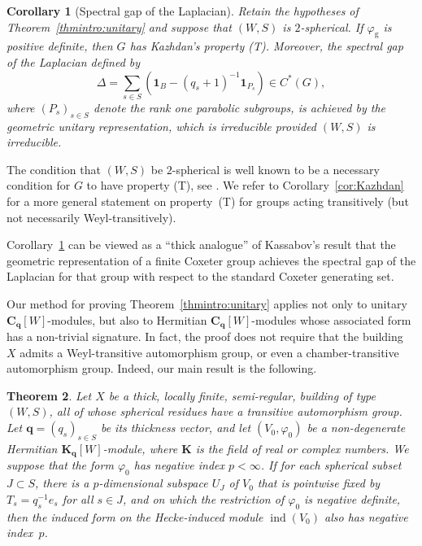 \documentclass[12pt,a4paper]{amsproc}
\newtheorem{thmintro}{Theorem}
\newtheorem{corintro}[thmintro]{Corollary}
\theoremstyle{definition}
\DeclareMathOperator{\Ind}{ind}
\newcommand{\CC}{\mathbf C}
\newcommand{\KK}{\mathbf K}
\newcommand{\one}{\mathbf 1}
\begin{document}
 \begin{corintro}[Spectral gap of the Laplacian]\label{corintro:Kazhdan}
Retain the hypotheses of Theorem~\ref{thmintro:unitary} and suppose that $(W, S)$ is $2$-spherical. 
If $\varphi_{\mathrm{g}}$ is positive definite, then $G$ has Kazhdan's property (T). Moreover, the spectral gap of the Laplacian defined by 
$$\Delta = \sum_{s \in S} (\one_B - (q_s+1)^{-1} \one_{P_s}) \in C^*(G), $$
where $(P_s)_{s \in S}$ denote the rank one parabolic subgroups, is achieved by the geometric unitary representation, which is irreducible provided $(W, S)$ is irreducible. 
 \end{corintro}

The condition that  $(W, S)$ be $2$-spherical is well known to be a necessary condition for $G$ to have property (T), see \cite[\S2]{DymJan}.  We refer to  Corollary~\ref{cor:Kazhdan} for a more general statement on property~(T) for groups acting transitively (but not necessarily Weyl-transitively). 

Corollary~\ref{corintro:Kazhdan} can be viewed as a ``thick analogue'' of Kassabov's result  \cite[\S 6.1]{Ka11} that the geometric representation of a finite Coxeter group achieves the spectral gap of the Laplacian for  that group with respect to the standard Coxeter generating set. 

\medskip
Our method for proving Theorem~\ref{thmintro:unitary} applies not only to unitary $\CC_{\mathbf q}[W]$-modules, but also to  Hermitian  $\CC_{\mathbf q}[W]$-modules whose associated form has a non-trivial signature. In fact, the proof does not require that the building $X$ admits a Weyl-transitive automorphism group, or even a chamber-transitive automorphism group. Indeed, our main result is the following. 

\begin{thmintro}\label{thmintro:signature}
Let $X$ be a thick, locally finite, semi-regular, building of type $(W, S)$, all of whose spherical residues have a transitive automorphism group.  Let $\mathbf q = (q_s)_{s\in S}$ be its thickness vector, and let $(V_0, \varphi_0)$ be a non-degenerate Hermitian $\KK_{\mathbf q}[W]$-module, where $\KK$ is the field of real or complex numbers. 
We suppose that the form $\varphi_0$ has negative index $p< \infty$.  If for each spherical subset $J  \subset S$, there is a   $p$-dimensional subspace $U_J$ of $V_0$ that is pointwise fixed by $T_s =  q_s^{-1} e_s$  for all $s \in J$, and on which the restriction of $\varphi_0$ is negative definite, then  the  induced form on the Hecke-induced module $\Ind(V_0)$ also has negative index~$p$. 
\end{thmintro}
\end{document}
